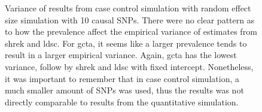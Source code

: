 \begin{figure}
{				
				\label{fig:ldscInCC10RandVar}
			}
			\caption[Variance of Case Control Simulation Results (10 Causal)]
			{Variance of results from case control simulation with random effect size simulation with 10 causal \glspl{SNP}.
				There were no clear pattern as to how the prevalence affect the empirical variance of estimates from \gls{shrek} and \gls{ldsc}. 
				For \gls{gcta}, it seems like a larger prevalence tends to result in a larger empirical variance. 
				Again, \gls{gcta} has the lowest variance, follow by \gls{shrek} and \gls{ldsc} with fixed intercept.
				Nonetheless, it was important to remember that in case control simulation, a much smaller amount of \glspl{SNP} was used, thus the results was not directly comparable to results from the quantitative simulation.
			} 
			\label{fig:CC10RandVar}
		\end{figure}
		
